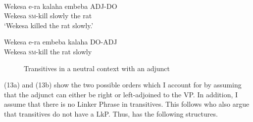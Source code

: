 \documentclass[output=paper,newtxmath,modfonts,nonflat,draft]{langsci/langscibook}
\begin{document}
\ea\label{ex:selvanathan:13}
\\
\ea\label{ex:selvanathan:13a}
\gll Wekesa  e-ra     kalaha   embeba  ADJ-DO \\
Wekesa   \textsc{sm}{}-kill   slowly    {the rat} \\
\glt `Wekesa killed the rat slowly.'

\ex\label{ex:selvanathan:13b}
\gll Wekesa  e-ra     embeba  kalaha   DO-ADJ \\
Wekesa   \textsc{sm}{}-kill   {the rat}    slowly \\
\z
\z
  
\begin{figure}
%
	\caption{\label{fig:selvanathan:5}Transitives in a neutral context with an adjunct}
\end{figure}

   
 (13a) and (13b) show the two possible orders which I account for by assuming that the  adjunct can either be right or left-adjoined to the VP. In addition, I assume that there is no Linker Phrase in transitives. This follows \citet{Baker2006} who also argue that  transitives do not have a LkP. Thus,   has the following structures.
\end{document}
